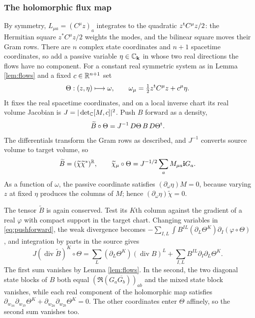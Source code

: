 \subsubsection*{The holomorphic flux map}
By symmetry, $L_{\mu a}=(C^\mu z)_a$ integrates to the quadratic $z^{\rm t}C^\mu z/2$: the
Hermitian square $z^*C^\mu z/2$ weights the modes, and the bilinear square moves their Gram
rows. There are $n$ complex state coordinates and $n+1$ spacetime coordinates, so add a
passive variable $\eta\in\mathbb{C}_{\mathbf k}$ in whose two real directions the flows have no component. For
a constant real symmetric system as in Lemma \ref{lem:flows} and a fixed $c\in\mathbb{R}^{n+1}$ set
\[
\Theta:(z,\eta)\longmapsto\omega,\qquad\omega_\mu=\tfrac12z^{\rm t}C^\mu z+c^\mu\eta .
\]
It fixes the real spacetime coordinates, and on a local inverse chart its real volume Jacobian
is $J=|\det_{\mathbb{C}}[M,c]|^2$. Push $B$ forward as a density,
\begin{equation}\label{eq:pushforward}
\widetilde B\circ\Theta=J^{-1}\,D\Theta\,B\,D\Theta^{\rm t}.
\end{equation}
The differentials transform the Gram rows as described, and $J^{-1}$ converts source volume to
target volume, so
\begin{equation}\label{eq:chi-tilde}
\widetilde B=(\widetilde\chi\widetilde\chi^*)^{\mathbb{R}},\qquad
\widetilde\chi_\mu\circ\Theta=J^{-1/2}\sum_aM_{\mu a}\mathbf i G_a .
\end{equation}
As a function of $\omega$, the passive coordinate satisfies $(\partial_\omega\eta)M=0$, because
varying $z$ at fixed $\eta$ produces the columns of $M$; hence $(\partial_\omega\eta)\widetilde\chi=0$.

The tensor $\widetilde B$ is again conserved. Test its $K$th column against the gradient of a
real $\varphi$ with compact support in the target chart. Changing variables in
\eqref{eq:pushforward}, the weak divergence becomes
$-\sum_{I,L}\int B^{IL}(\partial_L\Theta^K)\partial_I(\varphi\circ\Theta)$, and integration by
parts in the source gives
\[
J(\operatorname{div}\widetilde B)^K\circ\Theta=\sum_L(\partial_L\Theta^K)(\operatorname{div}B)^L
+\sum_{I,L}B^{IL}\partial_I\partial_L\Theta^K .
\]
The first sum vanishes by Lemma \ref{lem:flows}. In the second, the two diagonal state blocks
of $B$ both equal $(\Re(G_a\overline{G_b}))_{ab}$ and the mixed state block vanishes, while each
real component of the holomorphic map satisfies
$\partial_{w_{1a}}\partial_{w_{1b}}\Theta^K+\partial_{w_{2a}}\partial_{w_{2b}}\Theta^K=0$. The other
coordinates enter $\Theta$ affinely, so the second sum vanishes too.

